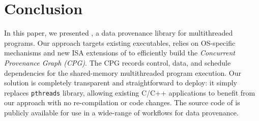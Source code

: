 \section{Conclusion}
\label{sec:conclusion}

In this paper, we presented \projecttitle, a data provenance library for multithreaded programs. Our approach targets existing executables, relies on OS-specific mechanisms and new ISA extensions of \intelpt  to efficiently build the {\em Concurrent Provenance Graph (CPG)}. The CPG records control, data, and schedule dependencies for the shared-memory multithreaded program execution. Our solution is completely transparent and straightforward to deploy: it simply replaces {\tt pthreads} library, allowing existing C/C++ applications to benefit from our approach with no re-compilation or code changes.  The source code of \projecttitle is publicly available for use in a wide-range of workflows for data provenance.

